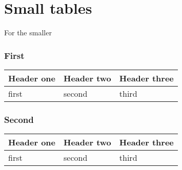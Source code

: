 \documentclass{article}
\begin{document}
\part*{Small tables}

For the smaller

\section*{First}


\begin{tabular}{l | l | l}
Header one  &  Header two  &  Header three
\\
\hline

first  &  second  &  third
\\

\end{tabular}

\section*{Second}


\begin{tabular}{l | l | l}
 Header one  &  Header two  &  Header three \\
\hline

 first  &  second  &  third \\

\end{tabular}
\end{document}
